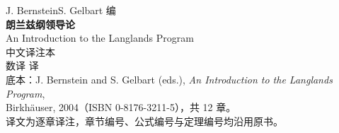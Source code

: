 \begin{titlepage}
\centering
\vspace*{3cm}
{\large J. Bernstein\quad S. Gelbart 编}\\[0.4cm]
{\Huge\bfseries 朗兰兹纲领导论}\\[0.5cm]
{\Large An Introduction to the Langlands Program}\\[2.4cm]
{\LARGE 中文译注本}\\[0.6cm]
{\large 数译 译}\\[3.2cm]
{\small
底本：J. Bernstein and S. Gelbart (eds.), \emph{An Introduction to the Langlands Program},\\
Birkhäuser, 2004（ISBN 0-8176-3211-5），共 12 章。\\
译文为逐章译注，章节编号、公式编号与定理编号均沿用原书。}
\vfill
\end{titlepage}
